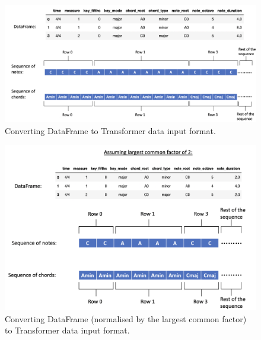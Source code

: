 \begin{figure}
    \centering
    \includegraphics[scale=0.3]{Figures/Transformer 2}
    \decoRule
    \caption{Converting DataFrame to Transformer data input format.}
    \label{fig:Transformer}
    \end{figure}

\begin{figure}
    \centering
    \includegraphics[scale=0.3]{Figures/Transformer LCF}
    \decoRule
    \caption{Converting DataFrame (normalised by the largest common factor) to Transformer data input format.}
    \label{fig:Transformer LCF}
    \end{figure}

